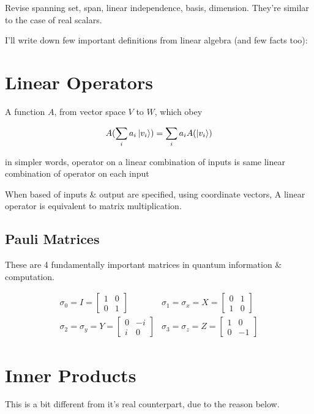 Revise spanning set, span, linear independence, basis, dimension. They're similar to the case of real scalars.

I'll write down few important definitions from linear algebra (and few facts too):

\section{Linear Operators}

A function $A$, from vector space $V$ to $W$, which obey 

$$
A(\sum_i a_i\ket{v_i}) = \sum_i a_iA(\ket{v_i})
$$

in simpler words, operator on a linear combination of inputs is same linear combination of operator on each input

When based of inputs \& output are specified, using coordinate vectors, A linear operator is equivalent to matrix multiplication.

\subsection{Pauli Matrices}
These are 4 fundamentally important matrices in quantum information \& computation.

\begin{align*}
\sigma_0 = I = \begin{bmatrix}  1 & 0 \\ 0 & 1\end{bmatrix}
&
\sigma_1 = \sigma_x = X = \begin{bmatrix}  0 & 1 \\ 1 & 0\end{bmatrix}
\\
\sigma_2 = \sigma_y = Y = \begin{bmatrix}  0 & -i \\ i & 0\end{bmatrix}
&
\sigma_3 = \sigma_z = Z = \begin{bmatrix}  1 & 0 \\ 0 & -1\end{bmatrix}
\end{align*}

\section{Inner Products}

This is a bit different from it's real counterpart, due to the reason below.

